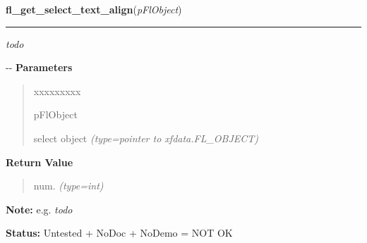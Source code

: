     \label{xformslib:flselect:fl_get_select_text_align}

    \vspace{0.5ex}

\hspace{.8\funcindent}\begin{boxedminipage}{\funcwidth}

    \raggedright \textbf{fl\_get\_select\_text\_align}(\textit{pFlObject})

    \vspace{-1.5ex}

    \rule{\textwidth}{0.5\fboxrule}
\setlength{\parskip}{2ex}

\emph{todo}

-{}-
\setlength{\parskip}{1ex}
      \textbf{Parameters}
      \vspace{-1ex}

      \begin{quote}
        \begin{Ventry}{xxxxxxxxx}

          \item[pFlObject]


select object
            {\it (type=pointer to xfdata.FL\_OBJECT)}

        \end{Ventry}

      \end{quote}

      \textbf{Return Value}
    \vspace{-1ex}

      \begin{quote}

num.
      {\it (type=int)}

      \end{quote}

\textbf{Note:} 
e.g. \emph{todo}


\textbf{Status:} 
Untested + NoDoc + NoDemo = NOT OK


    \end{boxedminipage}

    \label{xformslib:flselect:fl_set_select_text_align}

    \vspace{0.5ex}

